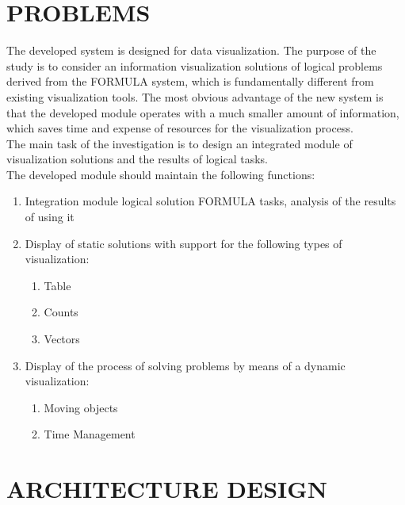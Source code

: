 \documentclass[a4paper, 10pt, conference]{ieeeconf}
\begin{document}
\section{PROBLEMS}
The developed system is designed for data visualization. The purpose of the study is to consider an information visualization solutions of logical problems derived from the FORMULA system, which is fundamentally different from existing visualization tools. The most obvious advantage of the new system is that the developed module operates with a much smaller amount of information, which saves time and expense of resources for the visualization process.\\
The main task of the investigation is to design an integrated module of visualization solutions and the results of logical tasks.\\
The developed module should maintain the following functions:
\begin{enumerate}
\item Integration module logical solution FORMULA tasks, analysis of the results of using it
\item Display of static solutions with support for the following types of visualization:
\begin{enumerate}
\item Table
\item Counts
\item Vectors
\end{enumerate}
\item Display of the process of solving problems by means of a dynamic visualization:
\begin{enumerate}
\item Moving objects
\item Time Management
\end{enumerate}
\end{enumerate}

\section{ARCHITECTURE DESIGN}
\end{document}
